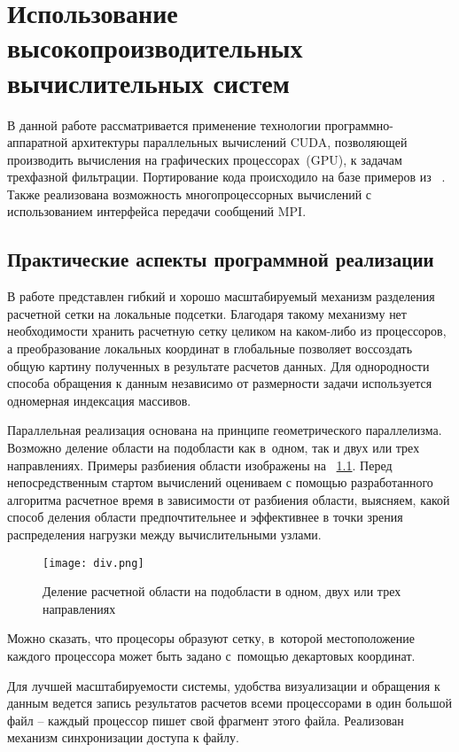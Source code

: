 \chapter{Использование высокопроизводительных вычислительных систем} \label{ch:ch4}

В данной работе рассматривается применение технологии программно-аппаратной архитектуры
параллельных вычислений CUDA, позволяющей производить вычисления на графических
процессорах~(GPU), к задачам трехфазной фильтрации.
Портирование кода происходило на базе примеров из ~\cite{Sanders-CUDA}.
Также реализована возможность многопроцессорных вычислений с использованием
интерфейса передачи сообщений MPI.

\section{Практические аспекты программной реализации} \label{ch:ch4/sect1}

В работе представлен гибкий и хорошо масштабируемый механизм разделения
расчетной сетки на локальные подсетки. Благодаря такому механизму
нет необходимости хранить расчетную сетку целиком на каком-либо из
процессоров, а преобразование локальных координат в глобальные
позволяет воссоздать общую картину полученных в результате расчетов
данных. Для однородности способа обращения к данным независимо
от размерности задачи используется одномерная индексация массивов.

Параллельная реализация основана на принципе геометрического параллелизма.
Возможно деление области на подобласти как в~одном, так и двух или трех направлениях.
Примеры разбиения области изображены на ~\ref{pic_div}.
Перед непосредственным стартом вычислений оцениваем с помощью разработанного алгоритма расчетное время в зависимости от разбиения
области, выясняем, какой способ деления области предпочтительнее и эффективнее в точки зрения распределения нагрузки между вычислительными узлами.

\begin{figure}[!ht]
\centering
\texttt{[image: div.png]} 
\caption{Деление расчетной области на подобласти в одном, двух или трех направлениях}
\label{pic_div}
\end{figure}

Можно сказать, что процесоры образуют сетку, в~которой местоположение каждого процессора может быть задано с~помощью декартовых координат.

Для лучшей масштабируемости системы, удобства визуализации и обращения
к данным ведется запись результатов расчетов всеми процессорами в один большой файл -- каждый процессор
пишет свой фрагмент этого файла. Реализован механизм синхронизации доступа к файлу.

